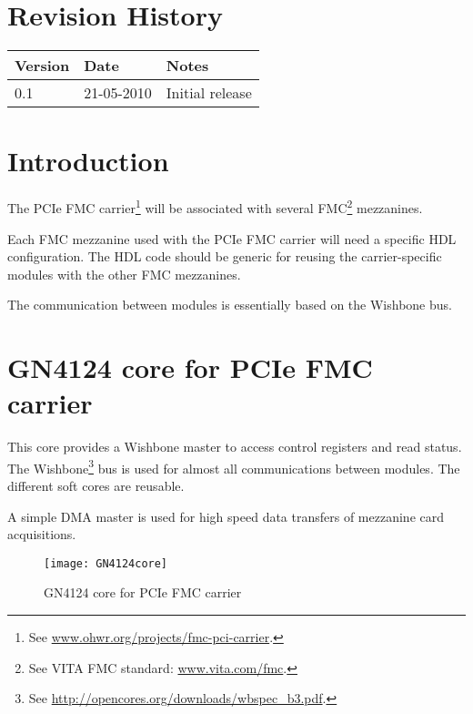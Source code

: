 \documentclass[10pt,a4paper]{cerndoc}
\begin{document}
  \cerntitle
  \section*{Revision History}
  \begin{tabularx}{\textwidth}{|p{3cm}|p{3cm}|X|}
    \hline \textbf{Version}&\textbf{Date}&\textbf{Notes}\\ \hline \hline
    0.1 & 21-05-2010 & Initial release\\ \hline

  \end{tabularx}

  \tableofcontents
  \listoffigures
  \clearpage


  \section{Introduction}
The PCIe FMC carrier\footnote{See \href{http://www.ohwr.org/projects/fmc-pci-carrier}{www.ohwr.org/projects/fmc-pci-carrier}.} will be associated with several FMC\footnote{See VITA FMC standard: \href{http://www.vita.com/fmc}{www.vita.com/fmc}.} mezzanines. 

Each FMC mezzanine used with the PCIe FMC carrier will need a specific HDL configuration. The HDL code should be generic for reusing the carrier-specific modules with the other FMC mezzanines. 

 The communication between modules is essentially based on the Wishbone bus.




  \section{GN4124 core for PCIe FMC carrier}
  This core provides a Wishbone master to access control registers and read status.  The Wishbone\footnote{See \href{http://opencores.org/downloads/wbspec\_b3.pdf}{http://opencores.org/downloads/wbspec\_b3.pdf}.} bus is used for almost all communications between modules. The different soft cores are reusable.
  
  A simple DMA master is used for high speed data transfers of mezzanine card acquisitions.
  
\begin{figure}[!ht]
	\centering
		\texttt{[image: GN4124core]}
	\caption{GN4124 core for PCIe FMC carrier}
	\label{fig:GCWWM}
\end{figure} 
\end{document}
